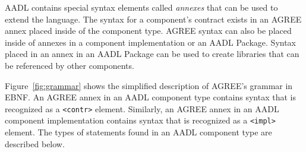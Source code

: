 \documentclass{llncs}
\begin{document}
AADL contains special syntax elements called \textit{annexes} that can be used to extend the language. The syntax for a component's contract exists in an AGREE annex placed inside of the component type.  AGREE syntax can also be placed inside of annexes in a component implementation or an AADL Package. Syntax placed in an annex in an AADL Package can be used to create libraries that can be referenced by other components.  

Figure~\ref{fig:grammar} shows the simplified description of AGREE's grammar in EBNF. An AGREE annex in an AADL component type contains syntax that is recognized as a \texttt{<contr>} element. Similarly, an AGREE annex in an AADL component implementation contains syntax that is recognized as a \texttt{<impl>} element. The types of statements found in an AADL component type are described below.


\end{document}
